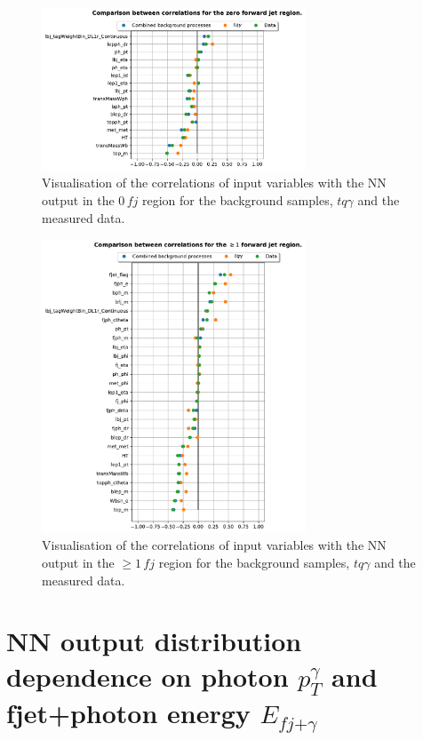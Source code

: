 \begin{figure}
    \centering
    \includegraphics[width=0.7\textwidth]{Plots/corr0fjvariables.pdf}
    \caption{Visualisation of the correlations of input variables with the NN output in the $0\,fj$ region for the background samples, $tq\gamma$ and the measured data.}
    \label{fig:corr0fj}
\end{figure}
\begin{figure}
    \centering
    \includegraphics[width=0.7\textwidth]{Plots/corr1fjvariables1.pdf}
    \caption{Visualisation of the correlations of input variables with the NN output in the $\geq 1\,fj$ region for the background samples, $tq\gamma$ and the measured data.}
    \label{fig:corr1fj}
\end{figure} 

\section{NN output distribution dependence on photon \texorpdfstring{$p_T^\gamma$}{pTGamma} and fjet+photon energy \texorpdfstring{$E_{fj\text{+}\gamma}$}{}}
\label{sec:dependence}

